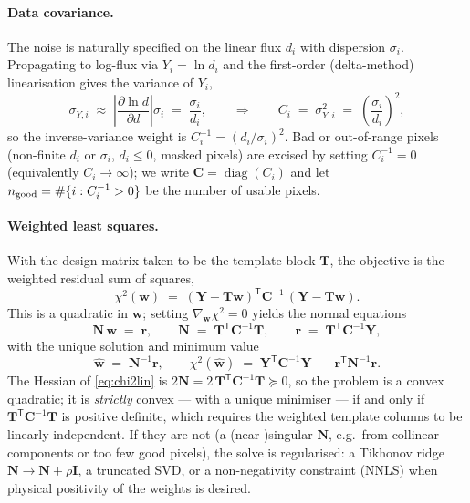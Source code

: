 \documentclass[11pt]{article}
\newcommand{\T}{\mathsf{T}}                    %
\newcommand{\diag}{\operatorname{diag}}
\begin{document}
\paragraph{Data covariance.}
The noise is naturally specified on the linear flux $d_i$ with dispersion
$\sigma_i$. Propagating to log-flux via $Y_i=\ln d_i$ and the first-order
(delta-method) linearisation gives the variance of $Y_i$,
\begin{equation}
  \sigma_{Y,i}\;\approx\;\left|\frac{\partial \ln d}{\partial d}\right|\sigma_i
  \;=\;\frac{\sigma_i}{d_i},
  \qquad\Longrightarrow\qquad
  C_i \;=\; \sigma_{Y,i}^2 \;=\; \left(\frac{\sigma_i}{d_i}\right)^2 ,
  \label{eq:weights}
\end{equation}
so the inverse-variance weight is $C_i^{-1}=(d_i/\sigma_i)^2$. Bad or out-of-range
pixels (non-finite $d_i$ or $\sigma_i$, $d_i\le 0$, masked pixels) are excised by
setting $C_i^{-1}=0$ (equivalently $C_i\to\infty$); we write $\mathbf{C}=\diag(C_i)$
and let $n_{\rm good}=\#\{i:C_i^{-1}>0\}$ be the number of usable pixels.

\paragraph{Weighted least squares.}
With the design matrix taken to be the template block $\mathbf{T}$, the objective
is the weighted residual sum of squares,
\begin{equation}
  \chi^2(\mathbf{w}) \;=\; (\mathbf{Y}-\mathbf{T}\mathbf{w})^\T \mathbf{C}^{-1}\,(\mathbf{Y}-\mathbf{T}\mathbf{w}).
  \label{eq:chi2lin}
\end{equation}
This is a quadratic in $\mathbf{w}$; setting $\nabla_{\mathbf w}\chi^2=0$ yields
the normal equations
\begin{equation}
  \mathbf{N}\,\mathbf{w} \;=\; \mathbf{r},
  \qquad
  \mathbf{N} \;=\; \mathbf{T}^\T\mathbf{C}^{-1}\mathbf{T},
  \qquad
  \mathbf{r} \;=\; \mathbf{T}^\T\mathbf{C}^{-1}\mathbf{Y},
  \label{eq:normaleq}
\end{equation}
with the unique solution and minimum value
\begin{equation}
  \widehat{\mathbf{w}} \;=\; \mathbf{N}^{-1}\mathbf{r},
  \qquad
  \chi^2(\widehat{\mathbf{w}}) \;=\; \mathbf{Y}^\T\mathbf{C}^{-1}\mathbf{Y}
  \;-\; \mathbf{r}^\T \mathbf{N}^{-1}\mathbf{r}.
  \label{eq:chi2profiled}
\end{equation}
The Hessian of \eqref{eq:chi2lin} is $2\mathbf{N}=2\,\mathbf{T}^\T\mathbf{C}^{-1}\mathbf{T}\succeq 0$,
so the problem is a convex quadratic; it is \emph{strictly} convex --- with a
unique minimiser --- if and only if $\mathbf{T}^\T\mathbf{C}^{-1}\mathbf{T}$ is
positive definite, which requires the weighted template columns to be linearly
independent. If they are not (a (near-)singular $\mathbf{N}$, e.g.\ from
collinear components or too few good pixels), the solve is regularised: a Tikhonov
ridge $\mathbf{N}\!\to\!\mathbf{N}+\rho\mathbf{I}$, a truncated SVD, or a
non-negativity constraint (NNLS) when physical positivity of the weights is
desired.
\end{document}
